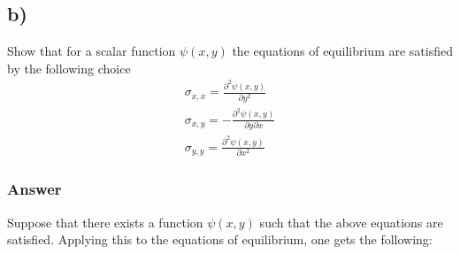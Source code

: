 \documentclass{article}
\begin{document}
\subsection*{b)}
Show that for a scalar function $\psi(x,y)$ the equations of equilibrium are satisfied by the following choice
\begin{align*}
    \sigma_{x,x} = \frac{\partial^2\psi(x,y)}{\partial y^2}\\
    \sigma_{x,y} = -\frac{\partial^2\psi(x,y)}{\partial y\partial x}\\
    \sigma_{y,y} = \frac{\partial^2\psi(x,y)}{\partial x^2}
\end{align*}

\subsubsection*{Answer}
\begin{comment}
Firstly, since $\sigma_{i,j}$ can be expressed in terms of $u$, one can write the sum:
\begin{align*}
    \sigma_{x,x} + \sigma_{y,y} &= \underbrace{\frac{Y(1-2\sigma_p)}{1+\sigma_p}}_{P}\left(\frac{\partial u_x}{\partial x} + \frac{\partial u_y}{\partial y}\right)
\end{align*}This is divergence of the deformation field, which in itself is only a function of $x$ and $y$. We call that function $\psi(x,y) = \nabla\cdot\mathbf{u}$.
Taking the square derivatives of $\psi(x,y)$, one gets the following:
\begin{align*}
    \frac{\partial^2\psi(x,y)}{\partial x^2} &= P\frac{\partial^2}{\partial x^2}\left(\frac{\partial u_x}{\partial x} + \frac{\partial u_y}{\partial y}\right)\\
    &= \sigma_{y,y}\\
    \frac{\partial^2\psi(x,y)}{\partial y^2} &= P\frac{\partial^2}{\partial y^2}\left(\frac{\partial u_x}{\partial x} + \frac{\partial u_y}{\partial y}\right)\\
    &= \sigma_{x,x}\\
    \frac{\partial^2\psi(x,y)}{\partial y\partial x} &= P\frac{\partial^2}{\partial y\partial x}\left(\frac{\partial u_x}{\partial x} + \frac{\partial u_y}{\partial y}\right)\\
    &= \sigma_{x,y}
\end{align*}
\end{comment}
Suppose that there exists a function $\psi(x,y)$ such that the above equations are satisfied. Applying this to the equations of equilibrium, one gets the following:
\end{document}
